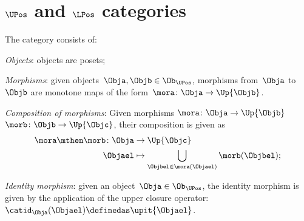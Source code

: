 %
%

\section{$\UPos$ and $\LPos$ categories}

\begin{definition}
\label{def:upos_cat}
The category \UPos consists of:
\begin{compactenum}
    \item \emph{Objects}: objects are posets;
    \item \emph{Morphisms}: given objects~$\Obja,\Objb\in \Ob_\UPos$, morphisms from~$\Obja$ to~$\Objb$ are monotone maps of the form~$\mora \colon \Obja \to \Up{\Objb}$.
    \item \emph{Composition of morphisms}: Given morphisms $\mora\colon \Obja \to \Up{\Objb}$~ $\morb\colon \Objb\to \Up{\Objc}$, their composition is given as
    \begin{equation}
    \begin{aligned}
        \mora \mthen \morb \colon \Obja&\to \Up{\Objc}\\
        \Objael&\mapsto \bigcup_{\Objbel\in \mora(\Objael)}\morb(\Objbel);
    \end{aligned}
    \end{equation}
    \item \emph{Identity morphism}: given an object~$\Obja\in \Ob_\UPos$, the identity morphism is given by the application of the upper closure operator:~$\catid_\Obja(\Objael)\definedas \upit\{\Objael\}$.
\end{compactenum}
\end{definition}

